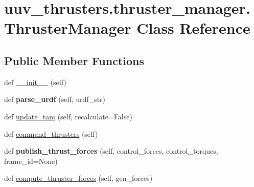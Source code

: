 \hypertarget{classuuv__thrusters_1_1thruster__manager_1_1ThrusterManager}{}\section{uuv\+\_\+thrusters.\+thruster\+\_\+manager.\+Thruster\+Manager Class Reference}
\label{classuuv__thrusters_1_1thruster__manager_1_1ThrusterManager}
\subsection*{Public Member Functions}
\begin{DoxyCompactItemize}
\item 
def \hyperlink{classuuv__thrusters_1_1thruster__manager_1_1ThrusterManager_a256d947278c99ab4f6096c8e1c97949e}{\+\_\+\+\_\+init\+\_\+\+\_\+} (self)
\item 
\mbox{\label{classuuv__thrusters_1_1thruster__manager_1_1ThrusterManager_a59997e838d43dab3ff43694a4494169b}} 
def {\bfseries parse\+\_\+urdf} (self, urdf\+\_\+str)
\item 
def \hyperlink{classuuv__thrusters_1_1thruster__manager_1_1ThrusterManager_a62be58f0aa543045939ac466f2f18374}{update\+\_\+tam} (self, recalculate=False)
\item 
def \hyperlink{classuuv__thrusters_1_1thruster__manager_1_1ThrusterManager_a452943d71a58fa6c8119b8abe06d11a3}{command\+\_\+thrusters} (self)
\item 
\mbox{\label{classuuv__thrusters_1_1thruster__manager_1_1ThrusterManager_a25851daa60de3aaa3208ec077e413f88}} 
def {\bfseries publish\+\_\+thrust\+\_\+forces} (self, control\+\_\+forces, control\+\_\+torques, frame\+\_\+id=None)
\item 
def \hyperlink{classuuv__thrusters_1_1thruster__manager_1_1ThrusterManager_a4a6d039fe6c2eeb7d5e0eae1e022fe96}{compute\+\_\+thruster\+\_\+forces} (self, gen\+\_\+forces)
\end{DoxyCompactItemize}
